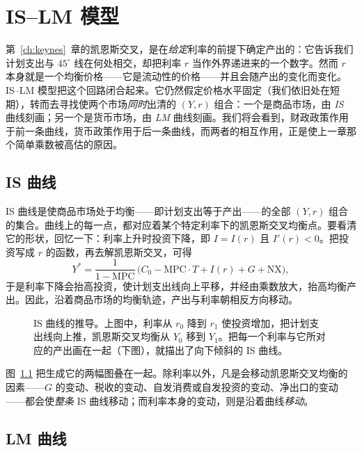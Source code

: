 \chapter{IS--LM 模型}
\label{ch:islm}

第~\ref{ch:keynes}~章的凯恩斯交叉，是在\emph{给定}利率的前提下确定产出的：它告诉我们计划支出与 $45^\circ$ 线在何处相交，却把利率 $r$ 当作外界递进来的一个数字。然而 $r$ 本身就是一个均衡价格——它是流动性的价格——并且会随产出的变化而变化。IS--LM 模型把这个回路闭合起来。它仍然假定价格水平固定（我们依旧处在短期），转而去寻找使两个市场\emph{同时}出清的 $(Y,r)$ 组合：一个是商品市场，由 \emph{IS} 曲线刻画；另一个是货币市场，由 \emph{LM} 曲线刻画。我们将会看到，财政政策作用于前一条曲线，货币政策作用于后一条曲线，而两者的相互作用，正是使上一章那个简单乘数被高估的原因。

\section{IS 曲线}

IS 曲线是使商品市场处于均衡——即计划支出等于产出——的全部 $(Y,r)$ 组合的集合。曲线上的每一点，都对应着某个特定利率下的凯恩斯交叉均衡点。要看清它的形状，回忆一下：利率上升时投资下降，即 $I=I(r)$ 且 $I'(r)<0$。把投资写成 $r$ 的函数，再去解凯恩斯交叉，可得
\[
Y^{*} = \frac{1}{1-\mathrm{MPC}}\,\big(C_0 - \mathrm{MPC}\cdot T + I(r) + G + \mathrm{NX}\big),
\]
于是利率下降会抬高投资，使计划支出线向上平移，并经由乘数放大，抬高均衡产出。因此，沿着商品市场的均衡轨迹，产出与利率朝相反方向移动。

\begin{figure}[h]
\centering

\caption{IS 曲线的推导。上图中，利率从 $r_0$ 降到 $r_1$ 使投资增加，把计划支出线向上推，凯恩斯交叉均衡从 $Y_0$ 移到 $Y_1$。把每一个利率与它所对应的产出画在一起（下图），就描出了向下倾斜的 IS 曲线。}
\label{fig:macro-15}
\end{figure}


图~\ref{fig:macro-15} 把生成它的两幅图叠在一起。除利率以外，凡是会移动凯恩斯交叉均衡的因素——$G$ 的变动、税收的变动、自发消费或自发投资的变动、净出口的变动——都会使\emph{整条} IS 曲线移动；而利率本身的变动，则是沿着曲线\emph{移动}。

\section{LM 曲线}


